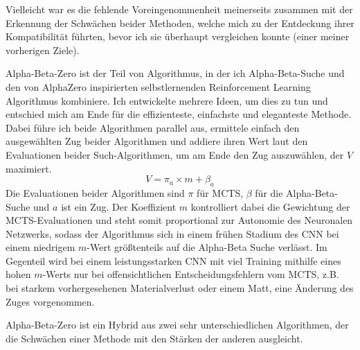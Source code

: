 \documentclass[
  manuscript=article,  %
  layout=publish,  %
  year=2023,
  volume=1,
]{extra/joas}
\begin{document}
Vielleicht war es die fehlende Voreingenommenheit meinerseits zusammen mit der Erkennung der Schwächen beider Methoden, welche mich zu der Entdeckung ihrer Kompatibilität führten, bevor ich sie überhaupt vergleichen konnte (einer meiner vorherigen Ziele).

Alpha-Beta-Zero ist der Teil von Algorithmus, in der ich Alpha-Beta-Suche und den von AlphaZero inspirierten selbstlernenden Reinforcement Learning Algorithmus kombiniere. Ich entwickelte mehrere Ideen, um dies zu tun und entschied mich am Ende für die effizienteste, einfachste und eleganteste Methode. Dabei führe ich beide Algorithmen parallel aus, ermittele einfach den ausgewählten Zug beider Algorithmen und addiere ihren Wert laut den Evaluationen beider Such-Algorithmen, um am Ende den Zug auszuwählen, der $V$ maximiert.
\begin{equation}
    V = \pi_a \times m + \beta_a
\end{equation}
Die Evaluationen beider Algorithmen sind $\pi$ für MCTS, $\beta$ für die Alpha-Beta-Suche und $a$ ist ein Zug. Der Koeffizient $m$ kontrolliert dabei die Gewichtung der MCTS-Evaluationen und steht somit proportional zur Autonomie des Neuronalen Netzwerks, sodass der Algorithmus sich in einem frühen Stadium des CNN bei einem niedrigem $m$-Wert größtenteils auf die Alpha-Beta Suche verlässt. Im Gegenteil wird bei einem leistungsstarken CNN mit viel Training mithilfe eines hohen $m$-Werts nur bei offensichtlichen Entscheidungsfehlern vom MCTS, z.B. bei starkem vorhergesehenen Materialverlust oder einem Matt, eine Änderung des Zuges vorgenommen. 

Alpha-Beta-Zero ist ein Hybrid aus zwei sehr unterschiedlichen Algorithmen, der die Schwächen einer Methode mit den Stärken der anderen ausgleicht. 
\end{document}

